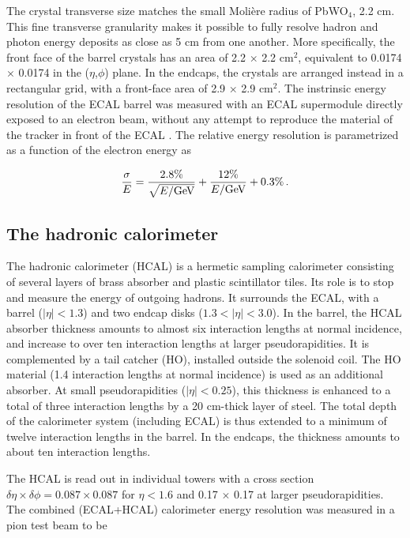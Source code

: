 The crystal transverse size matches the small Molière radius of PbWO$_4$, 2.2 cm. This fine transverse granularity makes it possible to fully resolve hadron and photon energy deposits as close as 5 cm from one another. More specifically, the front face of the barrel crystals has an area of 2.2 $\times$ 2.2 cm$^2$, equivalent to 0.0174 $\times$ 0.0174 in the ($\eta$,$\phi$) plane. In the endcaps, the crystals are arranged instead in a rectangular grid, with a front-face area of 2.9 $\times$ 2.9 cm$^2$. The instrinsic energy resolution of the ECAL barrel was measured with an ECAL supermodule directly exposed to an electron beam, without any attempt to reproduce the material of the tracker in front of the ECAL \cite{Ingram_2007}. The relative energy resolution is parametrized as a function of the electron energy as 

\begin{equation}
    \frac{\sigma}{E} = \frac{2.8\%}{\sqrt{E / \mathrm{GeV}}} + \frac{12\%}{E / \mathrm{GeV}} + 0.3\% \mend
\end{equation}

\subsection{The hadronic calorimeter}

The hadronic calorimeter (HCAL) \cite{CERN-LHCC-97-031} is a hermetic sampling calorimeter consisting of several layers of brass absorber and plastic scintillator tiles. Its role is to stop and measure the energy of outgoing hadrons. It surrounds the ECAL, with a barrel ($|\eta| < 1.3$) and two endcap disks ($1.3 < |\eta| < 3.0$). In the barrel, the HCAL absorber thickness amounts to almost six interaction lengths at normal incidence, and increase to over ten interaction lengths at larger pseudorapidities. It is complemented by a tail catcher (HO), installed outside the solenoid coil. The HO material (1.4 interaction lengths at normal incidence) is used as an additional absorber. At small pseudorapidities ($|\eta| < 0.25$), this thickness is enhanced to a total of three interaction lengths by a 20 cm-thick layer of steel. The total depth of the calorimeter system (including ECAL) is thus extended to a minimum of twelve interaction lengths in the barrel. In the endcaps, the thickness amounts to about ten interaction lengths.

The HCAL is read out in individual towers with a cross section $\delta\eta \times \delta\phi = 0.087 \times 0.087$ for $\eta < 1.6$ and 0.17 $\times$ 0.17 at larger pseudorapidities. The combined (ECAL+HCAL) calorimeter energy resolution was measured in a pion test beam to be 

